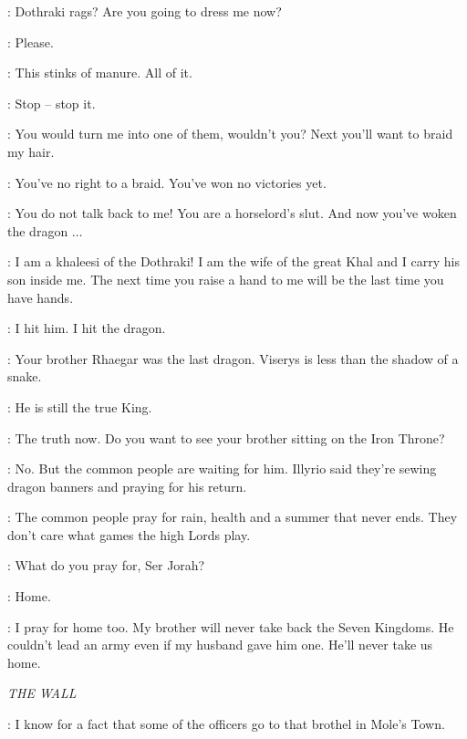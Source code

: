 \VISERYS: Dothraki rags? Are you going to dress me now? 

\DAENERYS: Please. 

\VISERYS: This stinks of manure. All of it. 

\DAENERYS: Stop -- stop it. 

\VISERYS: You would turn me into one of them, wouldn't you? Next you'll want to braid my hair. 

\DAENERYS: You've no right to a braid. You've won no victories yet. 


\VISERYS: You do not talk back to me! You are a horselord's slut. And now you've woken the dragon $\ldots$ 


\DAENERYS: I am a khaleesi of the Dothraki! I am the wife of the great Khal and I carry his son inside me. The next time you raise a hand to me will be the last time you have hands. 


\DAENERYS: I hit him. I hit the dragon. 

\JORAH: Your brother Rhaegar was the last dragon. Viserys is less than the shadow of a snake. 

\DAENERYS: He is still the true King. 

\JORAH: The truth now. Do you want to see your brother sitting on the Iron Throne? 

\DAENERYS: No. But the common people are waiting for him. Illyrio said they're sewing dragon banners and praying for his return. 

\JORAH: The common people pray for rain, health and a summer that never ends. They don't care what games the high Lords play. 

\DAENERYS: What do you pray for, Ser Jorah? 

\JORAH: Home. 

\DAENERYS: I pray for home too. My brother will never take back the Seven Kingdoms. He couldn't lead an army even if my husband gave him one. He'll never take us home. 


\scene

\textit{THE WALL}


\SAM: I know for a fact that some of the officers go to that brothel in Mole's Town. 

